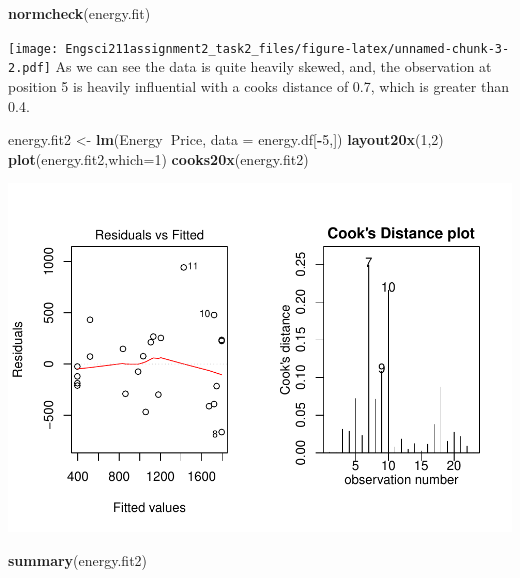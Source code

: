 \documentclass[]{article}
\newenvironment{Shaded}{\begin{snugshade}}{\end{snugshade}}
\newcommand{\DataTypeTok}[1]{\textcolor[rgb]{0.13,0.29,0.53}{#1}}
\newcommand{\DecValTok}[1]{\textcolor[rgb]{0.00,0.00,0.81}{#1}}
\newcommand{\KeywordTok}[1]{\textcolor[rgb]{0.13,0.29,0.53}{\textbf{#1}}}
\newcommand{\NormalTok}[1]{#1}
\newcommand{\OperatorTok}[1]{\textcolor[rgb]{0.81,0.36,0.00}{\textbf{#1}}}
\newcommand{\StringTok}[1]{\textcolor[rgb]{0.31,0.60,0.02}{#1}}
\begin{document}
\begin{Shaded}
\begin{Highlighting}[]
\KeywordTok{normcheck}\NormalTok{(energy.fit)}
\end{Highlighting}
\end{Shaded}

\texttt{[image: Engsci211assignment2\_task2\_files/figure-latex/unnamed-chunk-3-2.pdf]}
As we can see the data is quite heavily skewed, and, the observation at
position 5 is heavily influential with a cooks distance of 0.7, which is
greater than 0.4.

\begin{Shaded}
\begin{Highlighting}[]
\NormalTok{energy.fit2 <-}\StringTok{ }\KeywordTok{lm}\NormalTok{(Energy}\OperatorTok{~}\NormalTok{Price, }\DataTypeTok{data =}\NormalTok{ energy.df[}\OperatorTok{-}\DecValTok{5}\NormalTok{,])}
\KeywordTok{layout20x}\NormalTok{(}\DecValTok{1}\NormalTok{,}\DecValTok{2}\NormalTok{)}
\KeywordTok{plot}\NormalTok{(energy.fit2,}\DataTypeTok{which=}\DecValTok{1}\NormalTok{)}
\KeywordTok{cooks20x}\NormalTok{(energy.fit2)}
\end{Highlighting}
\end{Shaded}

\includegraphics{Engsci211assignment2_task2_files/figure-latex/unnamed-chunk-4-1.pdf}

\begin{Shaded}
\begin{Highlighting}[]
\KeywordTok{summary}\NormalTok{(energy.fit2)}
\end{Highlighting}
\end{Shaded}
\end{document}
